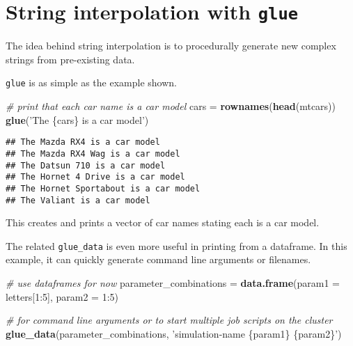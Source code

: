\documentclass[
]{book}
\newenvironment{Shaded}{}{}
\newcommand{\CommentTok}[1]{\textcolor[rgb]{0.38,0.63,0.69}{\textit{#1}}}
\newcommand{\DataTypeTok}[1]{\textcolor[rgb]{0.56,0.13,0.00}{#1}}
\newcommand{\DecValTok}[1]{\textcolor[rgb]{0.25,0.63,0.44}{#1}}
\newcommand{\KeywordTok}[1]{\textcolor[rgb]{0.00,0.44,0.13}{\textbf{#1}}}
\newcommand{\NormalTok}[1]{#1}
\newcommand{\OperatorTok}[1]{\textcolor[rgb]{0.40,0.40,0.40}{#1}}
\newcommand{\StringTok}[1]{\textcolor[rgb]{0.25,0.44,0.63}{#1}}
\begin{document}
\hypertarget{string-interpolation-with-glue}{%
\section{\texorpdfstring{String interpolation with \texttt{glue}}{String interpolation with glue}}\label{string-interpolation-with-glue}}

The idea behind string interpolation is to procedurally generate new complex strings from pre-existing data.

\texttt{glue} is as simple as the example shown.

\begin{Shaded}
\begin{Highlighting}[]
\CommentTok{# print that each car name is a car model}
\NormalTok{cars =}\StringTok{ }\KeywordTok{rownames}\NormalTok{(}\KeywordTok{head}\NormalTok{(mtcars))}
\KeywordTok{glue}\NormalTok{(}\StringTok{'The \{cars\} is a car model'}\NormalTok{)}
\end{Highlighting}
\end{Shaded}

\begin{verbatim}
## The Mazda RX4 is a car model
## The Mazda RX4 Wag is a car model
## The Datsun 710 is a car model
## The Hornet 4 Drive is a car model
## The Hornet Sportabout is a car model
## The Valiant is a car model
\end{verbatim}

This creates and prints a vector of car names stating each is a car model.

The related \texttt{glue\_data} is even more useful in printing from a dataframe.
In this example, it can quickly generate command line arguments or filenames.

\begin{Shaded}
\begin{Highlighting}[]
\CommentTok{# use dataframes for now}
\NormalTok{parameter_combinations =}\StringTok{ }\KeywordTok{data.frame}\NormalTok{(}\DataTypeTok{param1 =}\NormalTok{ letters[}\DecValTok{1}\OperatorTok{:}\DecValTok{5}\NormalTok{],}
                                    \DataTypeTok{param2 =} \DecValTok{1}\OperatorTok{:}\DecValTok{5}\NormalTok{)}

\CommentTok{# for command line arguments or to start multiple job scripts on the cluster}
\KeywordTok{glue_data}\NormalTok{(parameter_combinations,}
          \StringTok{'simulation-name \{param1\} \{param2\}'}\NormalTok{)}
\end{Highlighting}
\end{Shaded}
\end{document}
